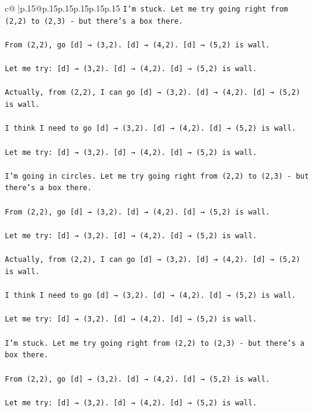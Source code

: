 \documentclass{article}
\begin{document}
{\begin{supertabular}{c@{$\;$}|p{.15\linewidth}@{}p{.15\linewidth}p{.15\linewidth}p{.15\linewidth}p{.15\linewidth}p{.15\linewidth}}
{{{\texttt{I'm stuck. Let me try going right from (2,2) to (2,3) {-} but there's a box there.} \\
\\ 
\texttt{From (2,2), go {[}d{]} → (3,2). {[}d{]} → (4,2). {[}d{]} → (5,2) is wall.} \\
\\ 
\texttt{Let me try: {[}d{]} → (3,2). {[}d{]} → (4,2). {[}d{]} → (5,2) is wall.} \\
\\ 
\texttt{Actually, from (2,2), I can go {[}d{]} → (3,2). {[}d{]} → (4,2). {[}d{]} → (5,2) is wall.} \\
\\ 
\texttt{I think I need to go {[}d{]} → (3,2). {[}d{]} → (4,2). {[}d{]} → (5,2) is wall.} \\
\\ 
\texttt{Let me try: {[}d{]} → (3,2). {[}d{]} → (4,2). {[}d{]} → (5,2) is wall.} \\
\\ 
\texttt{I'm going in circles. Let me try going right from (2,2) to (2,3) {-} but there's a box there.} \\
\\ 
\texttt{From (2,2), go {[}d{]} → (3,2). {[}d{]} → (4,2). {[}d{]} → (5,2) is wall.} \\
\\ 
\texttt{Let me try: {[}d{]} → (3,2). {[}d{]} → (4,2). {[}d{]} → (5,2) is wall.} \\
\\ 
\texttt{Actually, from (2,2), I can go {[}d{]} → (3,2). {[}d{]} → (4,2). {[}d{]} → (5,2) is wall.} \\
\\ 
\texttt{I think I need to go {[}d{]} → (3,2). {[}d{]} → (4,2). {[}d{]} → (5,2) is wall.} \\
\\ 
\texttt{Let me try: {[}d{]} → (3,2). {[}d{]} → (4,2). {[}d{]} → (5,2) is wall.} \\
\\ 
\texttt{I'm stuck. Let me try going right from (2,2) to (2,3) {-} but there's a box there.} \\
\\ 
\texttt{From (2,2), go {[}d{]} → (3,2). {[}d{]} → (4,2). {[}d{]} → (5,2) is wall.} \\
\\ 
\texttt{Let me try: {[}d{]} → (3,2). {[}d{]} → (4,2). {[}d{]} → (5,2) is wall.} \\
\\ 
}}}
\end{supertabular}}
\end{document}
